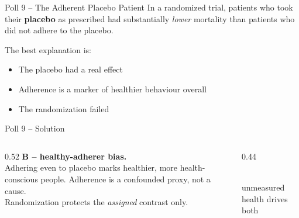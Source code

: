\documentclass[aspectratio=169]{beamer}
\begin{document}
\begin{frame}{Poll 9 \;--\; The Adherent Placebo Patient}
  \small
  In a randomized trial, patients who took their \textbf{placebo} as prescribed
  had substantially \emph{lower} mortality than patients who did not adhere to
  the placebo.
  \vspace{0.8em}

  The best explanation is:
  \begin{itemize}
    \item[\textbf{A.}] The placebo had a real effect
    \item[\textbf{B.}] Adherence is a marker of healthier behaviour overall
    \item[\textbf{C.}] The randomization failed
  \end{itemize}
\end{frame}

\begin{frame}{Poll 9 \;--\; Solution}
  \small
  \begin{columns}[T]
    \begin{column}{0.52\textwidth}
      \textcolor{good}{\textbf{B -- healthy-adherer bias.}}\\[0.4em]
      Adhering even to placebo marks healthier, more health-conscious people.
      Adherence is a confounded proxy, not a cause.\\[0.3em]
      Randomization protects the \emph{assigned} contrast only.
    \end{column}
    \begin{column}{0.44\textwidth}
      \centering
      \\[0.3em]
      {\scriptsize unmeasured health drives both}
    \end{column}
  \end{columns}
\end{frame}
\end{document}
